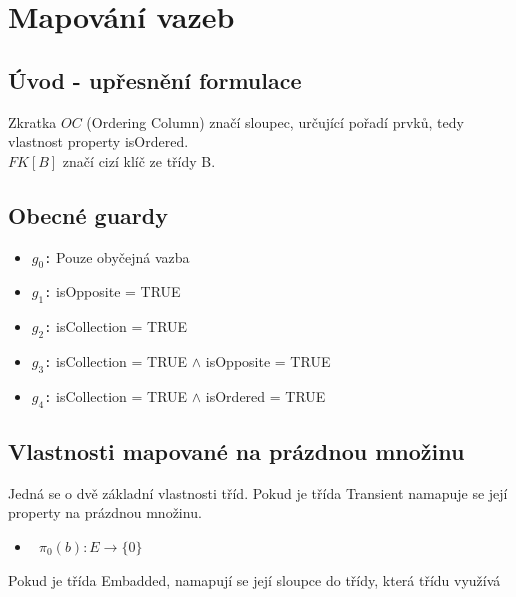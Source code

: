 \documentclass[11pt,a4paper]{article}
\begin{document}
\section{Mapování vazeb}
	\subsection{Úvod - upřesnění formulace}
	Zkratka $OC$ (Ordering Column) značí sloupec, určující pořadí prvků, tedy vlastnost property isOrdered. \\
	$FK[B]$ značí cizí klíč ze třídy B.
	
	\subsection{Obecné guardy}
	     \begin{itemize}
	     	\item $ g_0 $\texttt : {Pouze obyčejná vazba}				
         	\item $ g_1 $\texttt : {isOpposite = TRUE}
         	\item $ g_2 $\texttt : {isCollection = TRUE}
         	\item $ g_3 $\texttt : {isCollection = TRUE $\wedge$ isOpposite = TRUE}
         	\item $ g_4 $\texttt : {isCollection = TRUE $\wedge$ isOrdered = TRUE}    		  							
   		\end{itemize}						                                
	\subsection{Vlastnosti mapované na prázdnou množinu}
   		Jedná se o dvě základní vlastnosti tříd. Pokud je třída 
   		Transient namapuje se její property na prázdnou množinu. 
   		\begin{itemize}				    
         	\item \texttt	{
         					$\pi_0(b) : E \to \{ 0\}$  
         					}
   		\end{itemize}
   		Pokud je třída Embadded, namapují se její sloupce do třídy, která třídu využívá\\
\end{document}
